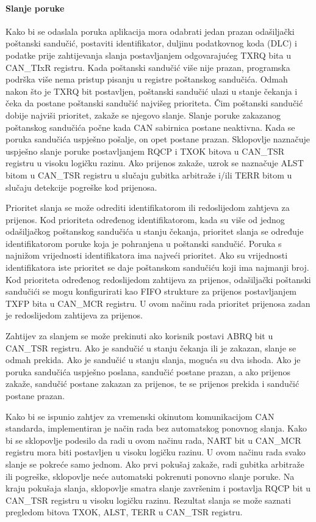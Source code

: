 \paragraph{Slanje poruke}

Kako bi se odaslala poruka aplikacija mora odabrati jedan prazan odašiljački poštanski sandučić, postaviti identifikator, duljinu podatkovnog koda (DLC) i podatke prije zahtijevanja slanja postavljanjem odgovarajućeg TXRQ bita u CAN\_TIxR registru. Kada poštanski sandučić više nije prazan, programska podrška više nema pristup pisanju u registre poštanskog sandučića. Odmah nakon što je TXRQ bit postavljen, poštanski sandučić ulazi u stanje čekanja i čeka da postane poštanski sandučić najvišeg prioriteta. Čim poštanski sandučić dobije najviši prioritet, zakaže se njegovo slanje. Slanje poruke zakazanog poštanskog sandučića počne kada CAN sabirnica postane neaktivna. Kada se poruka sandučića uspješno pošalje, on opet postane prazan. Sklopovlje naznačuje uspješno slanje poruke postavljanjem RQCP i TXOK bitova u CAN\_TSR registru u visoku logičku razinu. Ako prijenos zakaže, uzrok se naznačuje ALST bitom u CAN\_TSR registru u slučaju gubitka arbitraže i/ili TERR bitom u slučaju detekcije pogreške kod prijenosa.

Prioritet slanja se može odrediti identifikatorom ili redoslijedom zahtjeva za prijenos. Kod prioriteta određenog identifikatorom, kada su više od jednog odašiljačkog poštanskog sandučića u stanju čekanja, prioritet slanja se određuje identifikatorom poruke koja je pohranjena u poštanski sandučić. Poruka s najnižom vrijednosti identifikatora ima najveći prioritet. Ako su vrijednosti identifikatora iste prioritet se daje poštanskom sandučiću koji ima najmanji broj. Kod prioriteta određenog redoslijedom zahtijeva za prijenos, odašiljački poštanski sandučići se mogu konfigurirati kao FIFO strukture za prijenos postavljanjem TXFP bita u CAN\_MCR registru. U ovom načinu rada prioritet prijenosa zadan je redoslijedom zahtijeva za prijenos.

Zahtijev za slanjem se može prekinuti ako korisnik postavi ABRQ bit u CAN\_TSR registru. Ako je sandučić u stanju čekanja ili je zakazan, slanje se odmah prekida. Ako je sandučić u stanju slanja, moguća su dva ishoda. Ako je poruka sandučića uspješno poslana, sandučić postane prazan, a ako prijenos zakaže, sandučić postane zakazan za prijenos, te se prijenos prekida i sandučić postane prazan.

Kako bi se ispunio zahtjev za vremenski okinutom komunikacijom CAN standarda, implementiran je način rada bez automatskog ponovnog slanja. Kako bi se sklopovlje podesilo da radi u ovom načinu rada, NART bit u CAN\_MCR registru mora biti postavljen u visoku logičku razinu. U ovom načinu rada svako slanje se pokreće samo jednom. Ako prvi pokušaj zakaže, radi gubitka arbitraže ili pogreške, sklopovlje neće automatski pokrenuti ponovno slanje poruke. Na kraju pokušaja slanja, sklopovlje smatra slanje završenim i postavlja RQCP bit u CAN\_TSR registru u visoku logičku razinu. Rezultat slanja se može saznati pregledom bitova TXOK, ALST, TERR u CAN\_TSR registru.

